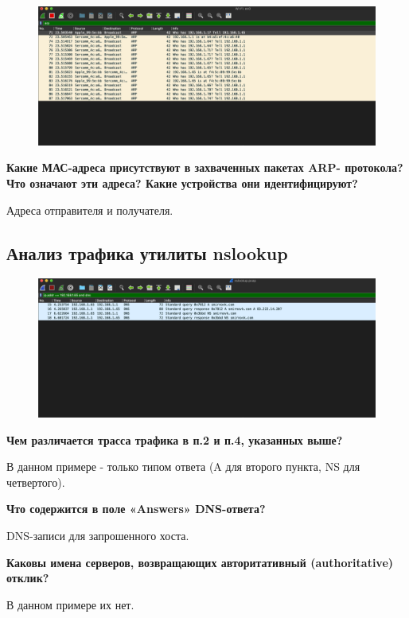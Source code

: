 \begin{figure}[H]
	\centering
	\includegraphics[width=0.7\linewidth]{"../Анализ трафика компьютерных сетей утилитой Wireshark/img/arp-1"}
	\caption{}
	\label{fig:arp-1}
\end{figure}

\textbf{Какие МАС-адреса присутствуют в захваченных пакетах ARP-
протокола? Что означают эти адреса? Какие устройства они
идентифицируют?}

Адреса отправителя и получателя.


\subsection{Анализ трафика утилиты nslookup}

\begin{figure}[H]
	\centering
	\includegraphics[width=0.7\linewidth]{"../Анализ трафика компьютерных сетей утилитой Wireshark/img/nslookup-1"}
	\caption{}
	\label{fig:nslookup-1}
\end{figure}

\textbf{Чем различается трасса трафика в п.2 и п.4, указанных выше? }

В данном примере - только типом ответа (A для второго пункта, NS для четвертого). 

\textbf{Что содержится в поле «Answers» DNS-ответа?}

DNS-записи для запрошенного хоста.

\textbf{Каковы имена серверов, возвращающих авторитативный (authoritative) отклик?}

В данном примере их нет.
